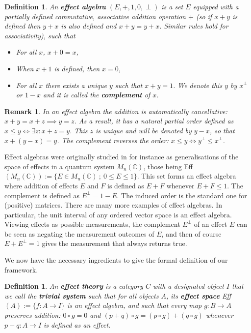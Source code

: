 \documentclass[b5paper,onecolumn,12pt,accepted=2019-05-03, issue=1, volume=1, shorttitle=papers/compositionality-1-1]{compositionalityarticle}
\newcounter{counter}
\numberwithin{counter}{section}
\newtheorem{definition}[counter]{Definition}
\newtheorem{remark}[counter]{Remark}
\newcommand{\C}{\mathbb{C}}
\begin{document}
\begin{definition}
	An \textbf{effect algebra} $(E,+,1,0,\perp)$ is a set $E$ equipped with a partially defined commutative, associative addition operation $+$ (so if $x+y$ is defined then $y+x$ is also defined and $x+y=y+x$. Similar rules hold for associativity), such that 
    \begin{itemize}
        \item For all $x$, $x+0=x$,
        \item When $x+1$ is defined, then $x=0$,
        \item For all $x$ there exists a unique $y$ such that $x+y=1$. We denote this $y$ by $x^\perp$ or $1-x$ and it is called the \textbf{complement} of $x$.
    \end{itemize}
\end{definition}
\begin{remark}
    In an effect algebra the addition is automatically cancellative: $x+y=x+z\implies y=z$. As a result, it has a natural partial order defined as $x\leq y\iff \exists z: x+z=y$. This $z$ is unique and will be denoted by $y-x$, so that $x+(y-x) = y$. The complement reverses the order: $x\leq y \iff y^\perp \leq x^\perp$.
\end{remark}

Effect algebras were originally studied in for instance \cite{foulis1994effect,bennett1997interval} as generalisations of the space of effects in a quantum system $M_n(\C)$, those being Eff$(M_n(\C)):= \{ E\in M_n(\C)~;~ 0\leq E\leq 1\}$. This set forms an effect algebra where addition of effects $E$ and $F$ is defined as $E+F$ whenever $E+F\leq 1$. The complement is defined as $E^\perp = 1-E$. The induced order is the standard one for (positive) matrices. There are many more examples of effect algebras. In particular, the unit interval of any ordered vector space is an effect algebra. Viewing effects as possible measurements, the complement $E^\perp$ of an effect $E$ can be seen as negating the measurement outcomes of $E$, and then of course $E+E^\perp = 1$ gives the measurement that always returns true.

We now have the necessary ingredients to give the formal definition of our framework.

\begin{definition}
	An \textbf{effect theory} is a category $C$ with a designated object $I$ that we call the \textbf{trivial system} such that for all objects $A$, its \textbf{effect space} Eff$(A):=\{f:A\rightarrow I\}$ is an effect algebra, and such that every map $g:B\rightarrow A$ preserves addition: $0\circ g = 0$ and $(p+q)\circ g = (p\circ g)+(q\circ g)$ whenever $p+q: A\rightarrow I$ is defined as an effect.
\end{definition}
\end{document}
